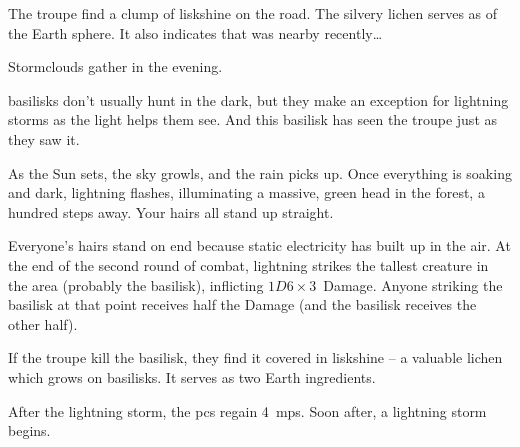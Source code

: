 The troupe find a clump of liskshine on the road.%
The silvery lichen serves as  of the Earth \gls{sphere}.
It also indicates that  was nearby recently\ldots

Stormclouds gather in the evening.

\ifodd\thefenestraYear%
  \Glspl{basilisk} don't usually hunt in the dark, but they make an exception for lightning storms as the light helps them see.
  And this \gls{basilisk} has seen the troupe just as they saw it.

  \begin{boxtext}
    As the Sun sets, the sky growls, and the rain picks up.
    Once everything is soaking and dark, lightning flashes, illuminating a massive, green head in the forest, a hundred \glspl{step} away.
    Your hairs all stand up straight.
  \end{boxtext}

  \basilisk

  Everyone's hairs stand on end because static electricity has built up in the air.
  At the end of the second \gls{round} of combat, lightning strikes the tallest creature in the area (probably the \gls{basilisk}), inflicting $1D6\times 3$~Damage.
  Anyone striking the \gls{basilisk} at that point receives half the Damage (and the \gls{basilisk} receives the other half).

  If the troupe kill the \gls{basilisk}, they find it covered in liskshine -- a valuable lichen which grows on \glspl{basilisk}.%
  It serves as two Earth \glspl{ingredient}.

  After the lightning storm, the \glspl{pc} regain 4~\glspl{mp}.
\else%
  Soon after, a lightning storm begins.
\fi%

\null
